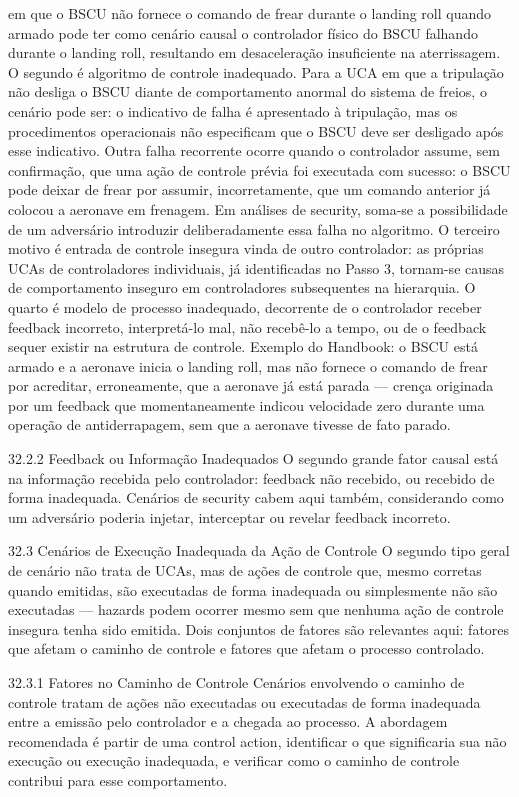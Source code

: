 em que o BSCU não fornece o comando de frear durante o landing roll quando armado pode ter como cenário causal o controlador físico do BSCU falhando durante o landing roll, resultando em desaceleração insuficiente na aterrissagem. O segundo é algoritmo de controle inadequado. Para a UCA em que a tripulação não desliga o BSCU diante de comportamento anormal do sistema de freios, o cenário pode ser: o indicativo de falha é apresentado à tripulação, mas os procedimentos operacionais não especificam que o BSCU deve ser desligado após esse indicativo. Outra falha recorrente ocorre quando o controlador assume, sem confirmação, que uma ação de controle prévia foi executada com sucesso: o BSCU pode deixar de frear por assumir, incorretamente, que um comando anterior já colocou a aeronave em frenagem. Em análises de security, soma-se a possibilidade de um adversário introduzir deliberadamente essa falha no algoritmo. O terceiro motivo é entrada de controle insegura vinda de outro controlador: as próprias UCAs de controladores individuais, já identificadas no Passo 3, tornam-se causas de comportamento inseguro em controladores subsequentes na hierarquia. O quarto é modelo de processo inadequado, decorrente de o controlador receber feedback incorreto, interpretá-lo mal, não recebê-lo a tempo, ou de o feedback sequer existir na estrutura de controle. Exemplo do Handbook: o BSCU está armado e a aeronave inicia o landing roll, mas não fornece o comando de frear por acreditar, erroneamente, que a aeronave já está parada — crença originada por um feedback que momentaneamente indicou velocidade zero durante uma operação de antiderrapagem, sem que a aeronave tivesse de fato parado.

32.2.2 Feedback ou Informação Inadequados O segundo grande fator causal está na informação recebida pelo controlador: feedback não recebido, ou recebido de forma inadequada. Cenários de security cabem aqui também, considerando como um adversário poderia injetar, interceptar ou revelar feedback incorreto.

32.3 Cenários de Execução Inadequada da Ação de Controle O segundo tipo geral de cenário não trata de UCAs, mas de ações de controle que, mesmo corretas quando emitidas, são executadas de forma inadequada ou simplesmente não são executadas — hazards podem ocorrer mesmo sem que nenhuma ação de controle insegura tenha sido emitida. Dois conjuntos de fatores são relevantes aqui: fatores que afetam o caminho de controle e fatores que afetam o processo controlado.

32.3.1 Fatores no Caminho de Controle Cenários envolvendo o caminho de controle tratam de ações não executadas ou executadas de forma inadequada entre a emissão pelo controlador e a chegada ao processo. A abordagem recomendada é partir de uma control action, identificar o que significaria sua não execução ou execução inadequada, e verificar como o caminho de controle contribui para esse comportamento.

